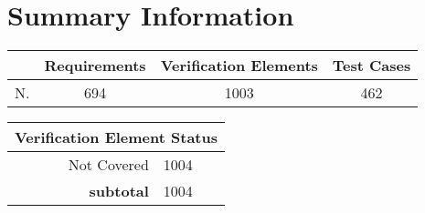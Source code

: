 \newpage
\section{Summary Information}
\begin{longtable}{rccc}
\toprule
 & \textbf{Requirements} & \textbf{Verification Elements} & \textbf{Test Cases} \\ \hline
N.& 694 & 1003 & 462 \\
\bottomrule
\end{longtable}
\begin{longtable}{rl}
\toprule
\multicolumn{2}{c}{\textbf{Verification Element Status}} \\ \hline
 Not Covered & 1004 \\
\hline
\textbf{subtotal} &  1004 \\
\bottomrule
\end{longtable}

